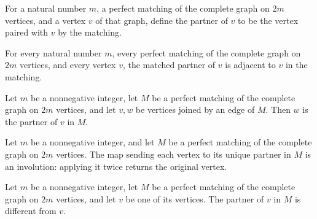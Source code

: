 \begin{definition}
\label{FABL.perfectMatchingPartner}
\leanok
{}
For a natural number $m$, a perfect matching of the complete graph on $2m$ vertices, and
a vertex $v$ of that graph, define the partner of $v$ to be the vertex paired with $v$
by the matching.
\end{definition}

\begin{theorem}
\label{FABL.perfectMatchingPartner_adj}
\leanok
{}
For every natural number $m$, every perfect matching of the complete graph on $2m$
vertices, and every vertex $v$, the matched partner of $v$ is adjacent to $v$ in the
matching.
\end{theorem}

\begin{theorem}
\label{FABL.perfectMatchingPartner_unique}
\leanok
{}
Let $m$ be a nonnegative integer, let $M$ be a perfect matching of the complete graph on
$2m$ vertices, and let $v,w$ be vertices joined by an edge of $M$. Then $w$ is the
partner of $v$ in $M$.
\end{theorem}

\begin{theorem}
\label{FABL.perfectMatchingPartner_involutive}
\leanok
{}
Let $m$ be a nonnegative integer, and let $M$ be a perfect matching of the complete
graph on $2m$ vertices. The map sending each vertex to its unique partner in $M$ is an
involution: applying it twice returns the original vertex.
\end{theorem}

\begin{theorem}
\label{FABL.perfectMatchingPartner_ne}
\leanok
{}
Let $m$ be a nonnegative integer, let $M$ be a perfect matching of the complete graph on
$2m$ vertices, and let $v$ be one of its vertices. The partner of $v$ in $M$ is
different from $v$.
\end{theorem}


